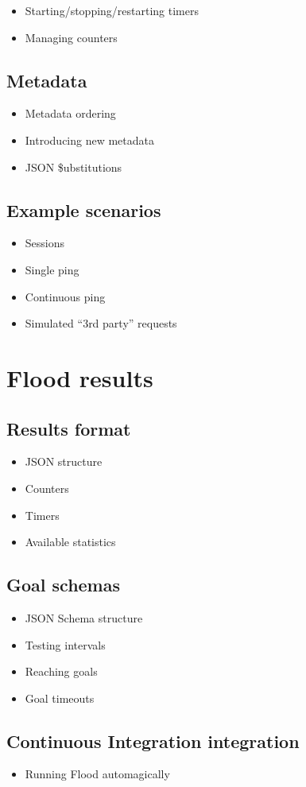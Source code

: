 \documentclass[a4paper]{article}
\begin{document}
\begin{itemize}
\item Starting/stopping/restarting timers
\item Managing counters
\end{itemize}
\subsection{Metadata}
\label{sec-3-5}
\label{ref-metadata}



\begin{itemize}
\item Metadata ordering
\item Introducing new metadata
\item JSON \$ubstitutions
\end{itemize}

\pagebreak
\subsection{Example scenarios}
\label{sec-3-6}
\label{ref-example_scenarios}



\begin{itemize}
\item Sessions
\item Single ping
\item Continuous ping
\item Simulated ``3rd party'' requests
\end{itemize}
\section{Flood results}
\label{sec-4}
\subsection{Results format}
\label{sec-4-1}


\begin{itemize}
\item JSON structure
\item Counters
\item Timers
\item Available statistics
\end{itemize}
\subsection{Goal schemas}
\label{sec-4-2}
\label{ref-goal_schemas}


\begin{itemize}
\item JSON Schema structure
\item Testing intervals
\item Reaching goals
\item Goal timeouts
\end{itemize}
\subsection{Continuous Integration integration}
\label{sec-4-3}


\begin{itemize}
\item Running Flood automagically
\end{itemize}
\end{document}
